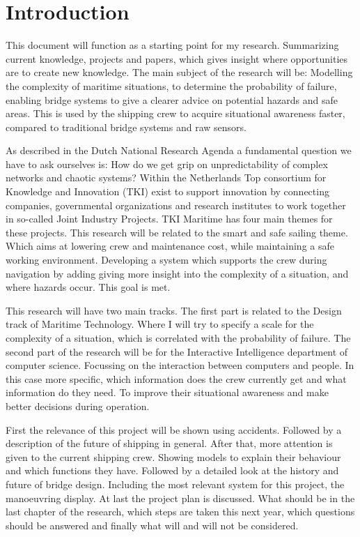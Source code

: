 \chapter*{Introduction}
\label{sec:introduction}
This document will function as a starting point for my research. Summarizing current knowledge, projects and papers, which gives insight where opportunities are to create new knowledge. The main subject of the research will be: Modelling the complexity of maritime situations, to determine the probability of failure, enabling bridge systems to give a clearer advice on potential hazards and safe areas. This is used by the shipping crew to acquire situational awareness faster, compared to traditional bridge systems and raw sensors.

As described in the Dutch National Research Agenda a fundamental question we have to ask ourselves is: How do we get grip on unpredictability of complex networks and chaotic systems? Within the Netherlands Top consortium for Knowledge and Innovation (TKI) exist to support innovation by connecting companies, governmental organizations and research institutes to work together in so-called Joint Industry Projects. TKI Maritime has four main themes for these projects. This research will be related to the smart and safe sailing theme. Which aims at lowering crew and maintenance cost, while maintaining a safe working environment. Developing a system which supports the crew during navigation by adding giving more insight into the complexity of a situation, and where hazards occur. This goal is met.

This research will have two main tracks. The first part is related to the Design track of Maritime Technology. Where I will try to specify a scale for the complexity of a situation, which is correlated with the probability of failure. The second part of the research will be for the Interactive Intelligence department of computer science. Focussing on the interaction between computers and people. In this case more specific, which information does the crew currently get and what information do they need. To improve their situational awareness and make better decisions during operation.

First the relevance of this project will be shown using accidents. Followed by a description of the future of shipping in general.
After that, more attention is given to the current shipping crew. Showing models to explain their behaviour and which functions they have. 
Followed by a detailed look at the history and future of bridge design. Including the most relevant system for this project, the manoeuvring display.
At last the project plan is discussed. What should be in the last chapter of the research, which steps are taken this next year, which questions should be answered and finally what will and will not be considered.
